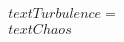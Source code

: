 \documentclass[preview]{standalone}
\begin{document}
\begin{align*}
\quad\\text{Turbulence} = \quad\\text{Chaos}
\end{align*}
\end{document}
